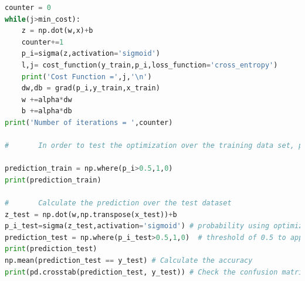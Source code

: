 \documentclass{article}
\begin{document}
\begin{lstlisting}[language=Python]
counter = 0
while(j>min_cost):
    z = np.dot(w,x)+b
    counter+=1
    p_i=sigma(z,activation='sigmoid')
    l,j= cost_function(y_train,p_i,loss_function='cross_entropy')
    print('Cost Function =',j,'\n')
    dw,db = grad(p_i,y_train,x_train)
    w +=alpha*dw
    b +=alpha*db
print('Number of iterations = ',counter)

#		In order to test the optimization over the training data set, prediction_train checks each probability found with the new parameters and approximates to 1 if p_i > 0.5 and 0 otherwise.

prediction_train = np.where(p_i>0.5,1,0)
print(prediction_train)

#		Calculate the prediction over the test dataset 
z_test = np.dot(w,np.transpose(x_test))+b
p_i_test=sigma(z_test,activation='sigmoid') # probability using optimized parameters
prediction_test = np.where(p_i_test>0.5,1,0)  # threshold of 0.5 to approximate y values
print(prediction_test)
np.mean(prediction_test == y_test) # Calculate the accuracy
print(pd.crosstab(prediction_test, y_test)) # Check the confusion matrix
\end{lstlisting}
\end{document}

